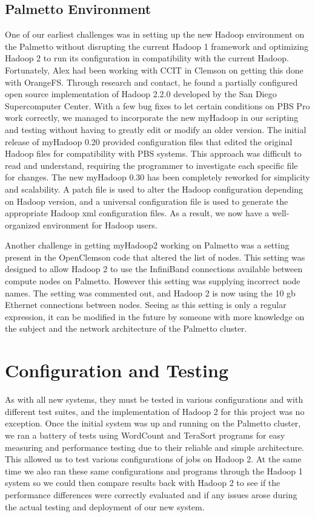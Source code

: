 \documentclass[conference]{IEEEtran}
\begin{document}
			\subsection{Palmetto Environment}
				One of our earliest challenges was in setting up the new Hadoop environment on the Palmetto without disrupting the current Hadoop 1 framework and optimizing Hadoop 2 to run its configuration in compatibility with the current Hadoop. Fortunately, Alex had been working with CCIT in Clemson on getting this done with OrangeFS. Through research and contact, he found a partially configured open source implementation of Hadoop 2.2.0 developed by the San Diego Supercomputer Center. With a few bug fixes to let certain conditions on PBS Pro work correctly, we managed to incorporate the new myHadoop in our scripting and testing without having to greatly edit or modify an older version. The initial release of myHadoop 0.20 provided configuration files that edited the original Hadoop files for compatibility with PBS systems. This approach was difficult to read and understand, requiring the programmer to investigate each specific file for changes. The new myHadoop 0.30 has been completely reworked for simplicity and scalability.  A patch file is used to alter the Hadoop configuration depending on Hadoop version, and a universal configuration file is used to generate the appropriate Hadoop xml configuration files. As a result, we now have a well-organized environment for Hadoop users.


                Another challenge in getting myHadoop2 working on Palmetto was a setting present in the OpenClemson code that altered the list of nodes. This setting was designed to allow Hadoop 2 to use the InfiniBand connections available between compute nodes on Palmetto. However this setting was supplying incorrect node names. The setting was commented out, and Hadoop 2 is now using the 10 gb Ethernet connections between nodes. Seeing as this setting is only a regular expression, it can be modified in the future by someone with more knowledge on the subject and the network architecture of the Palmetto cluster.


		\section{Configuration and Testing}
			As with all new systems, they must be tested in various configurations and with different test suites, and the implementation of Hadoop 2 for this project was no exception. Once the initial system was up and running on the Palmetto cluster, we ran a battery of tests using WordCount and TeraSort programs for easy measuring and performance testing due to their reliable and simple architecture. This allowed us to test various configurations of jobs on Hadoop 2. At the same time we also ran these same configurations and programs through the Hadoop 1 system so we could then compare results back with Hadoop 2 to see if the performance differences were correctly evaluated and if any issues arose during the actual testing and deployment of our new system.
\end{document}
